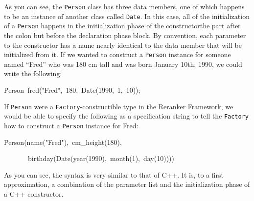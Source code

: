 \documentclass[a4paper]{article}
\let\textquotedbl="
\newenvironment{lyxcode}
{\par\begin{list}{}{
\scriptsize
\setlength{\leftmargin}{0.1in}
\setlength{\rightmargin}{\leftmargin}
\setlength{\listparindent}{0pt}%
\raggedright
\setlength{\itemsep}{0pt}
\setlength{\parsep}{0pt}
\normalfont\ttfamily}%
 \item[]}
{\end{list}}
\begin{document}
As you can see, the \texttt{Person} class has three data members,
one of which happens to be an instance of another class called \texttt{Date}.
In this case, all of the initialization of a \texttt{Person} happens
in the initialization phase of the constructor\textemdash{}the part
after the colon but before the declaration phase block. By convention,
each parameter to the constructor has a name nearly identical to the
data member that will be initialized from it. If we wanted to construct
a \texttt{Person} instance for someone named \textquotedblleft{}Fred\textquotedblright{}
who was 180 cm tall and was born January 10th, 1990, we could write
the following:
\begin{lyxcode}
Person~fred(\textquotedbl{}Fred\textquotedbl{},~180,~Date(1990,~1,~10));
\end{lyxcode}
If \texttt{Person} were a \texttt{Factory}-constructible type in the
Reranker Framework, we would be able to specify the following as a
specification string to tell the \texttt{Factory} how to construct
a \texttt{Person} instance for Fred:
\begin{lyxcode}
Person(name(\textquotedbl{}Fred\textquotedbl{}),~cm\_height(180),

~~~~~~~birthday(Date(year(1990),~month(1),~day(10))))
\end{lyxcode}
As you can see, the syntax is very similar to that of C++. It is,
to a first approximation, a combination of the parameter list and
the initialization phase of a C++ constructor.




\end{document}
